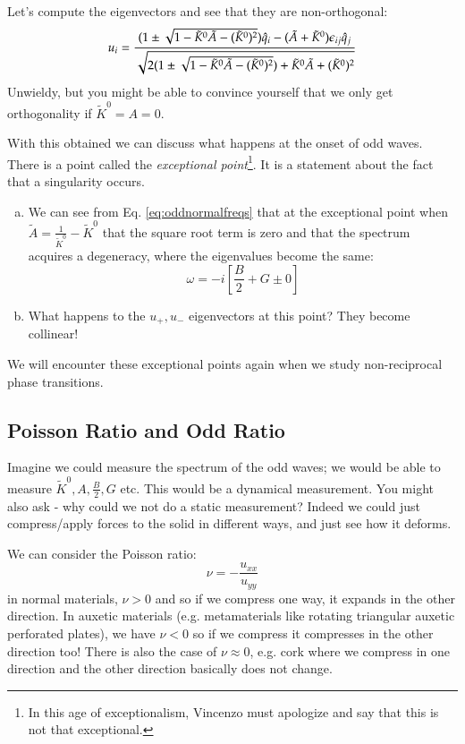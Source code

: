 Let's compute the eigenvectors and see that they are non-orthogonal:
\begin{equation}
    u_i = \frac{(1 \pm \sqrt{1 - \tilde{K}^0\tilde{A} - (\tilde{K}^0)^2})\hat{q}_i - (\tilde{A} + \tilde{K}^0)\epsilon_{ij}\hat{q}_j}{\sqrt{2(1\pm\sqrt{1 - \tilde{K}^0\tilde{A} - (\tilde{K}^0)^2}) + \tilde{K}^0\tilde{A} + (\tilde{K}^0)^2}}
\end{equation}
Unwieldy, but you might be able to convince yourself that we only get orthogonality if $\tilde{K}^0 = A = 0$.

With this obtained we can discuss what happens at the onset of odd waves. There is a point called the \emph{exceptional point}\footnote{In this age of exceptionalism, Vincenzo must apologize and say that this is not that exceptional.}. It is a statement about the fact that a singularity occurs.

\begin{enumerate}[(a)]
    \item We can see from Eq. \eqref{eq:oddnormalfreqs} that at the exceptional point when $\tilde{A} = \frac{1}{\tilde{K}^0} - \tilde{K}^0$ that the square root term is zero and that the spectrum acquires a degeneracy, where the eigenvalues become the same:
    \begin{equation}
        \omega = -i\left[\frac{B}{2} + G \pm 0\right]
    \end{equation}
    \item What happens to the $u_+, u_-$ eigenvectors at this point? They become collinear!
\end{enumerate}

We will encounter these exceptional points again when we study non-reciprocal phase transitions.

\subsection{Poisson Ratio and Odd Ratio}
Imagine we could measure the spectrum of the odd waves; we would be able to measure $\tilde{K}^0, A, \frac{B}{2}, G$ etc. This would be a dynamical measurement. You might also ask - why could we not do a static measurement? Indeed we could just compress/apply forces to the solid in different ways, and just see how it deforms.

We can consider the Poisson ratio:
\begin{equation}
    \nu = -\frac{u_{xx}}{u_{yy}}
\end{equation}
in normal materials, $\nu > 0$ and so if we compress one way, it expands in the other direction. In auxetic materials (e.g. metamaterials like rotating triangular auxetic perforated plates), we have $\nu < 0$ so if we compress it compresses in the other direction too! There is also the case of $\nu \approx 0$, e.g. cork where we compress in one direction and the other direction basically does not change. 

